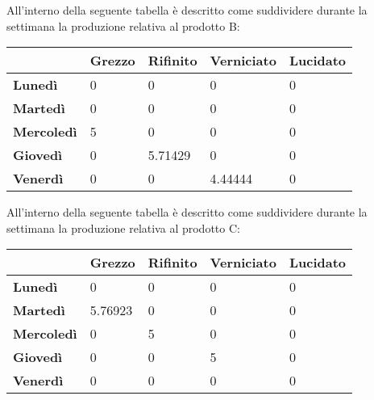 \documentclass[12pt]{article}
\begin{document}
All'interno della seguente tabella è descritto come suddividere durante la settimana la produzione relativa al prodotto B:
\begin{table}[H]
	\centering
	\setlength{\tabcolsep}{15pt} %
	\renewcommand{\arraystretch}{2} %
	\begin{center}
		\begin{tabular}{|l|l|l|l|l|}
			\hline
			& \textbf{Grezzo} & \textbf{Rifinito} & \textbf{Verniciato} & \textbf{Lucidato} \\ \hline
			\textbf{Lunedì}    & 0              & 0                 & 0                   & 0                 \\ \hline
			\textbf{Martedì}   & 0               & 0              & 0                   & 0                 \\ \hline
			\textbf{Mercoledì} & 5             & 0                 & 0             & 0                 \\ \hline
			\textbf{Giovedì}   & 0               & 5.71429              & 0                   & 0                 \\ \hline
			\textbf{Venerdì}   & 0               & 0                 & 4.44444               & 0                 \\ \hline
		\end{tabular}
	\end{center}
\end{table}

All'interno della seguente tabella è descritto come suddividere durante la settimana la produzione relativa al prodotto C:
\begin{table}[H]
	\centering
	\setlength{\tabcolsep}{15pt} %
	\renewcommand{\arraystretch}{2} %
	\begin{center}
		\begin{tabular}{|l|l|l|l|l|}
			\hline
			& \textbf{Grezzo} & \textbf{Rifinito} & \textbf{Verniciato} & \textbf{Lucidato} \\ \hline
			\textbf{Lunedì}    & 0               & 0                 & 0                   & 0                 \\ \hline
			\textbf{Martedì}   & 5.76923               & 0              & 0                   & 0                 \\ \hline
			\textbf{Mercoledì} & 0             & 5                 & 0             & 0                 \\ \hline
			\textbf{Giovedì}   & 0               & 0              & 5                   & 0                 \\ \hline
			\textbf{Venerdì}   & 0               & 0                 & 0               & 0                 \\ \hline
		\end{tabular}
	\end{center}
\end{table}
\end{document}
